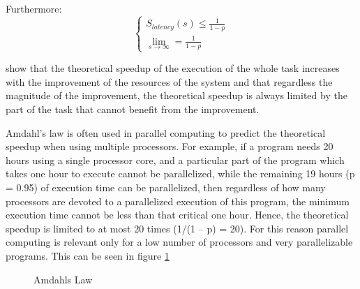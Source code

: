 Furthermore:
\begin{equation*}
  \begin{cases}
    S_{latency}(s) \leq \frac{1}{1-p} \\
    \lim_{s \to \infty} = \frac{1}{1-p}
  \end{cases}
\end{equation*}

show that the theoretical speedup of the execution of the whole task increases with the improvement of the resources of the system and that regardless the magnitude of the improvement, the theoretical speedup is always limited by the part of the task that cannot benefit from the improvement.

Amdahl's law is often used in parallel computing to predict the theoretical speedup when using multiple processors. For example, if a program needs 20 hours using a single processor core, and a particular part of the program which takes one hour to execute cannot be parallelized, while the remaining 19 hours (p = 0.95) of execution time can be parallelized, then regardless of how many processors are devoted to a parallelized execution of this program, the minimum execution time cannot be less than that critical one hour. Hence, the theoretical speedup is limited to at most 20 times (1/(1 -- p) = 20). For this reason parallel computing is relevant only for a low number of processors and very parallelizable programs. This can be seen in figure \ref{fig:amdahls-law}

\begin{figure}[H]
  \centering
  \caption{Amdahls Law}
  \label{fig:amdahls-law}
\end{figure}

